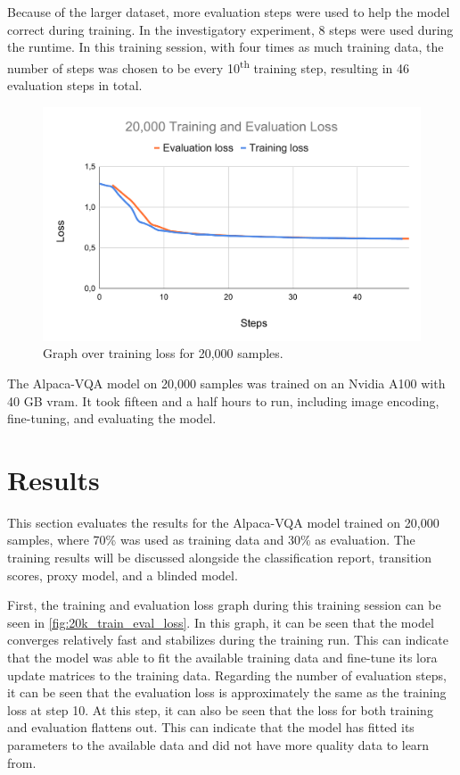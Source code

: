     Because of the larger dataset, more evaluation steps were used to help the model correct during training. In the investigatory experiment, 8 steps were used during the runtime. In this training session, with four times as much training data, the number of steps was chosen to be every 10\textsuperscript{th} training step, resulting in 46 evaluation steps in total. 

    \begin{figure}[htb]
        \centerline{
        \includegraphics[width=1.07\textwidth]{images/20k_train_evaluation_loss}}
        \caption[Graph over training loss for main experiment.]{Graph over training loss for 20,000 samples.}
        \label{fig:20k_train_eval_loss}
    \end{figure} 
    
    The Alpaca-VQA model on 20,000 samples was trained on an Nvidia A100 with 40 GB \gls{vram}. It took fifteen and a half hours to run, including image encoding, fine-tuning, and evaluating the model. 



    \section{Results}
    \label{sec4:results}
    This section evaluates the results for the Alpaca-VQA model trained on 20,000 samples, where 70\% was used as training data and 30\% as evaluation. The training results will be discussed alongside the classification report, transition scores, proxy model, and a blinded model.
    
    First, the training and evaluation loss graph during this training session can be seen in \autoref{fig:20k_train_eval_loss}. In this graph, it can be seen that the model converges relatively fast and stabilizes during the training run. This can indicate that the model was able to fit the available training data and fine-tune its \gls{lora} update matrices to the training data. Regarding the number of evaluation steps, it can be seen that the evaluation loss is approximately the same as the training loss at step 10. At this step, it can also be seen that the loss for both training and evaluation flattens out. This can indicate that the model has fitted its parameters to the available data and did not have more quality data to learn from. 


